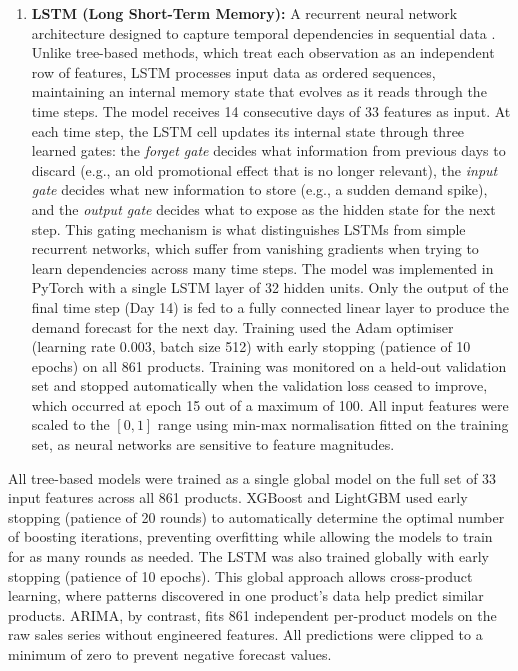 \begin{enumerate}
    \item \textbf{LSTM (Long Short-Term Memory):} A recurrent neural network architecture designed to capture temporal dependencies in sequential data \citep{hochreiter1997lstm}. Unlike tree-based methods, which treat each observation as an independent row of features, LSTM processes input data as ordered sequences, maintaining an internal memory state that evolves as it reads through the time steps. The model receives 14 consecutive days of 33 features as input. At each time step, the LSTM cell updates its internal state through three learned gates: the \textit{forget gate} decides what information from previous days to discard (e.g., an old promotional effect that is no longer relevant), the \textit{input gate} decides what new information to store (e.g., a sudden demand spike), and the \textit{output gate} decides what to expose as the hidden state for the next step. This gating mechanism is what distinguishes LSTMs from simple recurrent networks, which suffer from vanishing gradients when trying to learn dependencies across many time steps. The model was implemented in PyTorch \citep{paszke2019pytorch} with a single LSTM layer of 32 hidden units. Only the output of the final time step (Day 14) is fed to a fully connected linear layer to produce the demand forecast for the next day. Training used the Adam optimiser (learning rate 0.003, batch size 512) with early stopping (patience of 10 epochs) on all 861 products. Training was monitored on a held-out validation set and stopped automatically when the validation loss ceased to improve, which occurred at epoch 15 out of a maximum of 100. All input features were scaled to the $[0, 1]$ range using min-max normalisation fitted on the training set, as neural networks are sensitive to feature magnitudes.
\end{enumerate}

All tree-based models were trained as a single global model on the full set of 33 input features across all 861 products. XGBoost and LightGBM used early stopping (patience of 20 rounds) to automatically determine the optimal number of boosting iterations, preventing overfitting while allowing the models to train for as many rounds as needed. The LSTM was also trained globally with early stopping (patience of 10 epochs). This global approach allows cross-product learning, where patterns discovered in one product's data help predict similar products. ARIMA, by contrast, fits 861 independent per-product models on the raw sales series without engineered features. All predictions were clipped to a minimum of zero to prevent negative forecast values.

